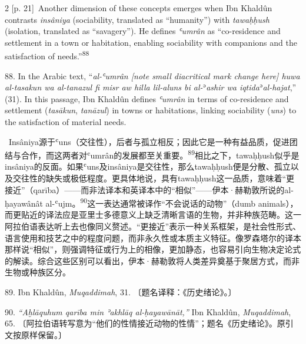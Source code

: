 \documentclass[10pt,a4paper]{article}
\begin{document}
\begin{paracol}{2}
\switchcolumn
{\scriptsize\color{gray} [p. 21]}\ Another dimension of these concepts emerges when Ibn Khaldûn contrasts \textit{insâniya} (sociability, translated as “humanity”) with \textit{tawaḥḥush} (isolation, translated as “savagery”). He defines \textit{ʿumrân} as “co-residence and settlement in a town or habitation, enabling sociability with companions and the satisfaction of needs.”\nobreak\textsuperscript{88}\par{\small 88. In the Arabic text, “\textit{al-ʿumrân [note small diacritical mark change here] huwa al-tasakun wa al-tanazul fi misr aw hilla lil-aluns bi al-}ʾ\textit{ashir wa iqtida}ʾ\textit{al-hajat},” (31). In this passage, Ibn Khaldûn defines \textit{ʿumrân} in terms of co-residence and settlement (\textit{tasākun}, \textit{tanāzul}) in towns or habitations, linking sociability (\textit{uns}) to the satisfaction of material needs.\par}
\switchcolumn*
{\scriptsize\color{gray} [p. 21]}\ Insâniya源于ʿuns（交往性），后者与孤立相反；因此它是一种有益品质，促进团结与合作，而这两者对ʿumrân的发展都至关重\mbox{要。\textsuperscript{89}}相比之下，tawaḥḥush似乎是insâniya的反面。如果ʿuns及insâniya是交往性，那么tawaḥḥush便是分散、孤立以及交往性的缺失或极低程度。更具体地说，具有tawaḥḥush这一品质，意味着“更接近”（qarība）——而非法译本和英译本中的“相似”——伊本·赫勒敦所说的al-ḥayawânât al-ʿujm。\nobreak\textsuperscript{90}这一表达通常被译作“不会说话的动物”（dumb animals），而更贴近的译法应是亚里士多德意义上缺乏清晰言语的生物，并非种族范畴。这一阿拉伯语表达听上去也像同义赘述。“更接近”表示一种关系框架，是社会性形式、语言使用和技艺之中的程度问题，而非永久性或本质主义特征。像罗森塔尔的译本那样说“相似”，则强调特征或行为上的相像，更加静态，也容易引向生物决定论式的解读。综合这些区别可以看出，伊本·赫勒敦将人类差异奠基于聚居方式，而非生物或种族区分。\par{\small 89. Ibn Khaldûn, \textit{Muqaddimah}, 31. 〔题名译释：《历史绪论》。〕\par}{\small 90. \textit{“Aḫlāquhum qarība min ʾakhlāq al-ḥayawānāt,”} Ibn Khaldûn, \textit{Muqaddimah}, 65. 〔阿拉伯语转写意为“他们的性情接近动物的性情”；题名《历史绪论》。原引文按原样保留。〕\par}
\switchcolumn

\end{paracol}
\end{document}
